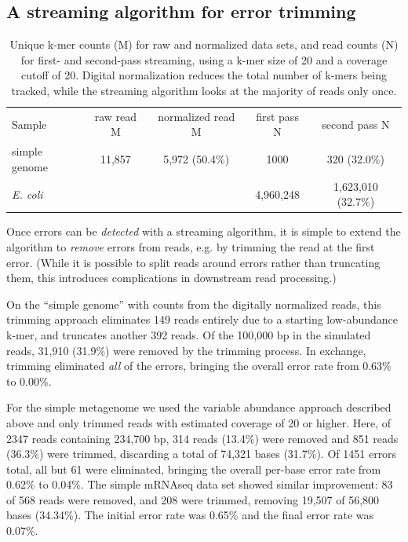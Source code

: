 \documentclass{article}
\begin{document}
\subsection{A streaming algorithm for error trimming}

\begin{table}
\begin{tabular}{|l|c|c|c|c|}
\hline
Sample & raw read M & normalized read M & first pass N & second pass N \\
simple genome & 11,857 & 5,972 (50.4\%) & 1000 & 320 (32.0\%) \\
{\em E. coli} & & & 4,960,248 & 1,623,010 (32.7\%) \\
\hline
\end{tabular}
\label{tab:streaming_counts}

\caption{Unique k-mer counts (M) for raw and normalized data sets, and
read counts (N) for first- and second-pass streaming, using a k-mer size
of 20 and a coverage cutoff of 20.  Digital normalization reduces the
total number of k-mers being tracked, while the streaming algorithm
looks at the majority of reads only once.}
\end{table}

Once errors can be {\em detected} with a streaming algorithm, it is
simple to extend the algorithm to {\em remove} errors from reads,
e.g. by trimming the read at the first error.  (While it is possible
to split reads around errors rather than truncating them, this
introduces complications in downstream read processing.)


On the ``simple genome'' with counts from the digitally normalized
reads, this trimming approach eliminates 149 reads entirely due to a
starting low-abundance k-mer, and truncates another 392 reads.  Of the
100,000 bp in the simulated reads, 31,910 (31.9\%) were removed by the
trimming process.  In exchange, trimming eliminated {\em all} of the
errors, bringing the overall error rate from 0.63\% to 0.00\%.


For the simple metagenome we used the variable abundance approach
described above and only trimmed reads with estimated coverage of 20
or higher.  Here, of 2347 reads containing 234,700 bp, 314 reads
(13.4\%) were removed and 851 reads (36.3\%) were trimmed, discarding
a total of 74,321 bases (31.7\%).  Of 1451 errors total, all but 61
were eliminated, bringing the overall per-base error rate from 0.62\% to
0.04\%.  The simple mRNAseq data set showed similar improvement: 83 of
568 reads were removed, and 208 were trimmed, removing 19,507 of
56,800 bases (34.34\%).  The initial error rate was 0.65\% and the
final error rate was 0.07\%.
\end{document}
